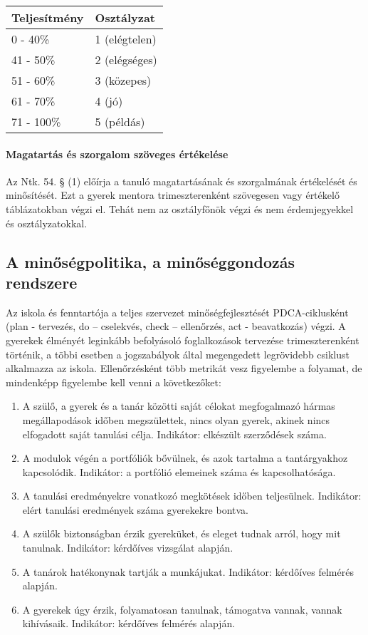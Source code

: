 \documentclass{article}
\providecommand{\tightlist}{%
  \setlength{\itemsep}{0pt}\setlength{\parskip}{0pt}}
\begin{document}
\begin{longtable}[]{@{}ll@{}}
\toprule
Teljesítmény & Osztályzat\tabularnewline
\midrule
\endhead
0 - 40\% & 1 (elégtelen)\tabularnewline
41 - 50\% & 2 (elégséges)\tabularnewline
51 - 60\% & 3 (közepes)\tabularnewline
61 - 70\% & 4 (jó)\tabularnewline
71 - 100\% & 5 (példás)\tabularnewline
\bottomrule
\end{longtable}

\hypertarget{magatartas-es-szorgalom-szoveges-ertekelese}{%
\paragraph{Magatartás és szorgalom szöveges
értékelése}\label{magatartas-es-szorgalom-szoveges-ertekelese}}

Az Ntk. 54. § (1) előírja a tanuló magatartásának és szorgalmának
értékelését és minősítését. Ezt a gyerek mentora trimeszterenként
szövegesen vagy értékelő táblázatokban végzi el. Tehát nem az
osztályfőnök végzi és nem érdemjegyekkel és osztályzatokkal.

\hypertarget{a-minosegpolitika-a-minoseggondozas-rendszere}{%
\subsection{A minőségpolitika, a minőséggondozás
rendszere}\label{a-minosegpolitika-a-minoseggondozas-rendszere}}

Az iskola és fenntartója a teljes szervezet minőségfejlesztését
PDCA-ciklusként (plan - tervezés, do -- cselekvés, check -- ellenőrzés,
act - beavatkozás) végzi. A gyerekek élményét leginkább befolyásoló
foglalkozások tervezése trimeszterenként történik, a többi esetben a
jogszabályok által megengedett legrövidebb csiklust alkalmazza az
iskola. Ellenőrzésként több metrikát vesz figyelembe a folyamat, de
mindenképp figyelembe kell venni a következőket:

\begin{enumerate}
\def\labelenumi{\arabic{enumi}.}
\tightlist
\item
  A szülő, a gyerek és a tanár közötti saját célokat megfogalmazó hármas
  megállapodások időben megszülettek, nincs olyan gyerek, akinek nincs
  elfogadott saját tanulási célja. Indikátor: elkészült szerződések
  száma.
\item
  A modulok végén a portfóliók bővülnek, és azok tartalma a
  tantárgyakhoz kapcsolódik. Indikátor: a portfólió elemeinek száma és
  kapcsolhatósága.
\item
  A tanulási eredményekre vonatkozó megkötések időben teljesülnek.
  Indikátor: elért tanulási eredmények száma gyerekekre bontva.
\item
  A szülők biztonságban érzik gyereküket, és eleget tudnak arról, hogy
  mit tanulnak. Indikátor: kérdőíves vizsgálat alapján.
\item
  A tanárok hatékonynak tartják a munkájukat. Indikátor: kérdőíves
  felmérés alapján.
\item
  A gyerekek úgy érzik, folyamatosan tanulnak, támogatva vannak, vannak
  kihívásaik. Indikátor: kérdőíves felmérés alapján.
\end{enumerate}
\end{document}
